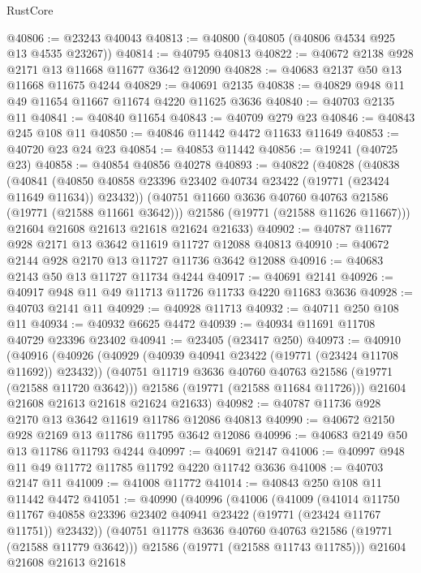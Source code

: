 \begin{lexlean}{RustCore}
\begin{coremodule}
@40806 := @23243 @40043
@40813 := @40800 (@40805 (@40806 @4534 @925 @13 @4535 @23267))
@40814 := @40795 @40813
@40822 := @40672 @2138 @928 @2171 @13 @11668 @11677 @3642 @12090
@40828 := @40683 @2137 @50 @13 @11668 @11675 @4244
@40829 := @40691 @2135
@40838 := @40829 @948 @11 @49 @11654 @11667 @11674 @4220 @11625 @3636
@40840 := @40703 @2135 @11
@40841 := @40840 @11654
@40843 := @40709 @279 @23
@40846 := @40843 @245 @108 @11
@40850 := @40846 @11442 @4472 @11633 @11649
@40853 := @40720 @23 @24 @23
@40854 := @40853 @11442
@40856 := @19241 (@40725 @23)
@40858 := @40854 @40856 @40278
@40893 := @40822
    (@40828
      (@40838
        (@40841 (@40850 @40858 @23396 @23402 @40734 @23422 (@19771 (@23424 @11649 @11634)) @23432))
        (@40751 @11660 @3636 @40760 @40763 @21586 (@19771 (@21588 @11661 @3642)))
        @21586
        (@19771 (@21588 @11626 @11667)))
      @21604
      @21608
      @21613
      @21618
      @21624
      @21633)
@40902 := @40787 @11677 @928 @2171 @13 @3642 @11619 @11727 @12088 @40813
@40910 := @40672 @2144 @928 @2170 @13 @11727 @11736 @3642 @12088
@40916 := @40683 @2143 @50 @13 @11727 @11734 @4244
@40917 := @40691 @2141
@40926 := @40917 @948 @11 @49 @11713 @11726 @11733 @4220 @11683 @3636
@40928 := @40703 @2141 @11
@40929 := @40928 @11713
@40932 := @40711 @250 @108 @11
@40934 := @40932 @6625 @4472
@40939 := @40934 @11691 @11708 @40729 @23396 @23402
@40941 := @23405 (@23417 @250)
@40973 := @40910
    (@40916
      (@40926
        (@40929 (@40939 @40941 @23422 (@19771 (@23424 @11708 @11692)) @23432))
        (@40751 @11719 @3636 @40760 @40763 @21586 (@19771 (@21588 @11720 @3642)))
        @21586
        (@19771 (@21588 @11684 @11726)))
      @21604
      @21608
      @21613
      @21618
      @21624
      @21633)
@40982 := @40787 @11736 @928 @2170 @13 @3642 @11619 @11786 @12086 @40813
@40990 := @40672 @2150 @928 @2169 @13 @11786 @11795 @3642 @12086
@40996 := @40683 @2149 @50 @13 @11786 @11793 @4244
@40997 := @40691 @2147
@41006 := @40997 @948 @11 @49 @11772 @11785 @11792 @4220 @11742 @3636
@41008 := @40703 @2147 @11
@41009 := @41008 @11772
@41014 := @40843 @250 @108 @11 @11442 @4472
@41051 := @40990
    (@40996
      (@41006
        (@41009
          (@41014
            @11750
            @11767
            @40858
            @23396
            @23402
            @40941
            @23422
            (@19771 (@23424 @11767 @11751))
            @23432))
        (@40751 @11778 @3636 @40760 @40763 @21586 (@19771 (@21588 @11779 @3642)))
        @21586
        (@19771 (@21588 @11743 @11785)))
      @21604
      @21608
      @21613
      @21618

\end{coremodule}
\end{lexlean}
